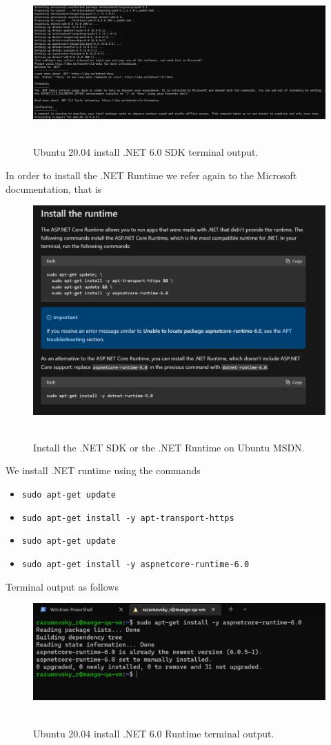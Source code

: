\begin{figure}[H]
    \centering
    \includegraphics[width=1\textwidth]{img/03_4_sdk_install_3}
    ~\caption{Ubuntu 20.04 install .NET 6.0 SDK terminal output.}\label{fig:figure6}
\end{figure}

In order to install the .NET Runtime we refer again to the Microsoft documentation, that is
\begin{figure}[H]
    \centering
    \includegraphics[width=1\textwidth]{img/03_2_runtime_documentation}
    ~\caption{Install the .NET SDK or the .NET Runtime on Ubuntu MSDN.}\label{fig:figure7}
\end{figure}
We install .NET runtime using the commands
\begin{itemize}
    \item \texttt{sudo apt-get update}
    \item \texttt{sudo apt-get install -y apt-transport-https}
    \item \texttt{sudo apt-get update}
    \item \texttt{sudo apt-get install -y aspnetcore-runtime-6.0}
\end{itemize}
Terminal output as follows
\begin{figure}[H]
    \centering
    \includegraphics[width=1\textwidth]{img/03_6_runtime_install}
    ~\caption{Ubuntu 20.04 install .NET 6.0 Runtime terminal output.}\label{fig:figure8}
\end{figure}

